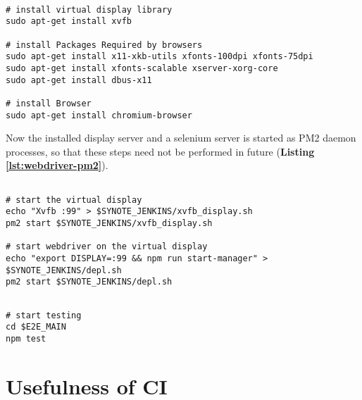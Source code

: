 \begin{listing}[H]
\begin{verbatim}

# install virtual display library
sudo apt-get install xvfb

# install Packages Required by browsers
sudo apt-get install x11-xkb-utils xfonts-100dpi xfonts-75dpi
sudo apt-get install xfonts-scalable xserver-xorg-core
sudo apt-get install dbus-x11

# install Browser
sudo apt-get install chromium-browser

\end{verbatim}
\label{lst:xvfb-browser-install}
\end{listing}

Now the installed display server and a selenium server is started as PM2 daemon processes, so that these steps need not be performed in future (\textbf{Listing \ref{lst:webdriver-pm2}}).

\begin{listing}[H]
\begin{verbatim}

# start the virtual display
echo "Xvfb :99" > $SYNOTE_JENKINS/xvfb_display.sh
pm2 start $SYNOTE_JENKINS/xvfb_display.sh

# start webdriver on the virtual display
echo "export DISPLAY=:99 && npm run start-manager" > $SYNOTE_JENKINS/depl.sh
pm2 start $SYNOTE_JENKINS/depl.sh

\end{verbatim}
\label{lst:webdriver-pm2}
\end{listing}

\begin{listing}[H]
\begin{verbatim}

# start testing
cd $E2E_MAIN
npm test

\end{verbatim}
\label{lst:run-e2e-tests}
\end{listing}

\section{Usefulness of CI}
\label{sec:usefulness-of-ci}
